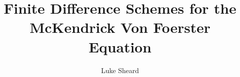 \documentclass[11pt, a4paper]{report}
\title{Finite Difference Schemes for the McKendrick Von Foerster Equation}
\author{Luke Sheard}
\theoremstyle{definition}
\theoremstyle{plain}
\theoremstyle{remark}
\begin{document}
  \def\biblio{}
  \raggedright
  \allowdisplaybreaks


  

  

  

  


  \newpage
  
  
\end{document}
